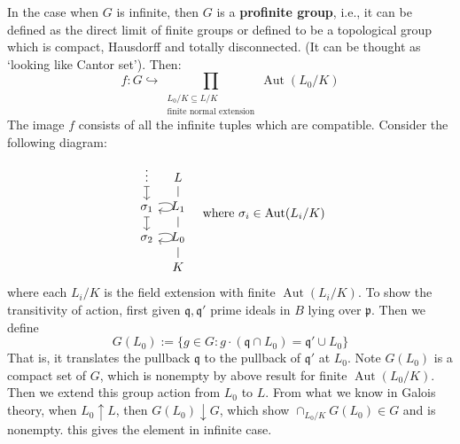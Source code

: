 \documentclass[12pt]{article}
\theoremstyle{definition}
\theoremstyle{plain}
\DeclareMathOperator{\Aut}{Aut}
\newcommand{\inj}{\hookrightarrow}
\begin{document}
\medskip
In the case when $G$ is infinite, then $G$ is a \textbf{profinite group}, i.e., it can be defined as the direct limit of finite groups or defined to be a topological group which is compact, Hausdorff and totally disconnected. (It can be thought as `looking like Cantor set'). Then:
\[
 f: G\inj \prod_{\substack{L_0/K\subseteq L/K\\ \text{finite normal extension}}}\Aut(L_0/K)
  \]
The image $f$ consists of all the infinite tuples which are compatible. Consider the following diagram:
\begin{equation}
  \begin{tikzcd}[row sep=small, column sep=tiny]
    \vdots \dar[|->]&L\ar[-]{d}\\
  \sigma_1\lar[loop right]\dar[|->]&  L_1\ar[-]{d}\\
  \sigma_2\lar[loop right]&  L_0\ar[-]{d}\\
    &K
  \end{tikzcd}\quad \text{where }\sigma_i\in \Aut(L_i/K)
\end{equation}
where each $L_i/K$ is the field extension with finite $\Aut(L_i/K)$. To show the transitivity of action, first given $\mathfrak{q}, \mathfrak{q}'$ prime ideals in $B$ lying over $\mathfrak{p}$. Then we define
\[G(L_0):=\{g\in G: g\cdot (\mathfrak{q}\cap L_0)=\mathfrak{q}'\cup L_0\}\]
That is, it translates the pullback $\mathfrak{q}$ to the pullback of $\mathfrak{q}'$ at $L_0$. Note $G(L_0)$ is a compact set of $G$, which is nonempty by above result for finite $\Aut(L_0/K)$. Then we extend this group action from $L_0$ to $L$. From what we know in Galois theory, when $L_0\uparrow L$, then $G(L_0)\downarrow G$, which show $\cap_{L_0/K} G(L_0)\in G$ and is nonempty. this gives the element in infinite case.
\end{document}
